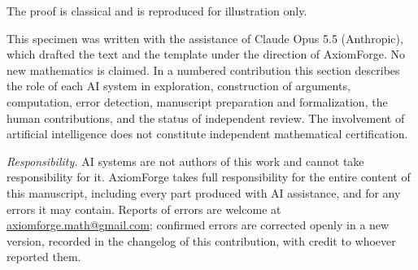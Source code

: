 
The proof is classical and is reproduced for illustration only.


This specimen was written with the assistance of Claude Opus 5.5 (Anthropic), which
drafted the text and the template under the direction of AxiomForge. No new
mathematics is claimed. In a numbered contribution this section describes the role of
each AI system in exploration, construction of arguments, computation, error detection,
manuscript preparation and formalization, the human contributions, and the status of
independent review. The involvement of artificial intelligence does not constitute
independent mathematical certification.

\emph{Responsibility.} AI systems are not authors of this work and cannot take responsibility
for it. AxiomForge takes full responsibility for the entire content of this manuscript,
including every part produced with AI assistance, and for any errors it may contain. Reports
of errors are welcome at \href{mailto:axiomforge.math@gmail.com}{axiomforge.math@gmail.com};
confirmed errors are corrected openly in a new version, recorded in the changelog of this
contribution, with credit to whoever reported them.
